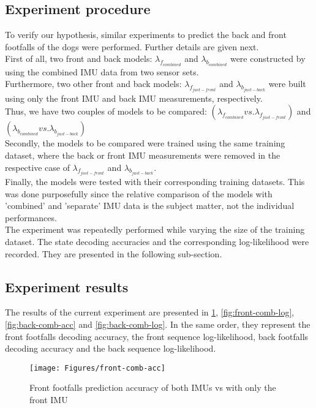 \subsection{Experiment procedure}
To verify our hypothesis, similar experiments to predict the back and front footfalls of the dogs were performed. Further details are given next.\\
First of all, two front and back models: \(\lambda_{f_{combined}}\) and \(\lambda_{b_{combined}}\) were constructed by using the combined IMU data from two sensor sets.\\
Furthermore, two other front and back models: \(\lambda_{f_{just-front}}\) and \(\lambda_{b_{just-back}}\) were built using only the front IMU and back IMU measurements, respectively. \\Thus, we have two couples of models to be compared: \(( \lambda_{f_{combined}} vs. \lambda_{f_{just-front}})\) and \((\lambda_{b_{combined}} vs. \lambda_{b_{just-back}})\) \\
Secondly, the models to be compared were trained using the same training dataset, where the back or front IMU measurements were removed in the respective case of \(\lambda_{f_{just-front}}\) and \(\lambda_{b_{just-back}}\). \\
Finally, the models were tested with their corresponding training datasets. This was done purposefully since the relative comparison of the models with 'combined' and 'separate' IMU data is the subject matter, not the individual performances.\\
The experiment was repeatedly performed while varying the size of the training dataset. The state decoding accuracies and the corresponding log-likelihood were recorded. They are presented in the following sub-section.

\subsection{Experiment results}
The results of the current experiment are presented in \ref{fig:front-comb-acc}, \ref{fig:front-comb-log}, \ref{fig:back-comb-acc} and \ref{fig:back-comb-log}. In the same order, they represent the front footfalls decoding accuracy, the front sequence log-likelihood,  back footfalls decoding accuracy and the back sequence log-likelihood.

\begin{figure}[ht!]
	\texttt{[image: Figures/front-comb-acc]}
	\caption{Front footfalls prediction accuracy of both IMUs vs with only the front IMU}
	\label{fig:front-comb-acc}
\end{figure}

